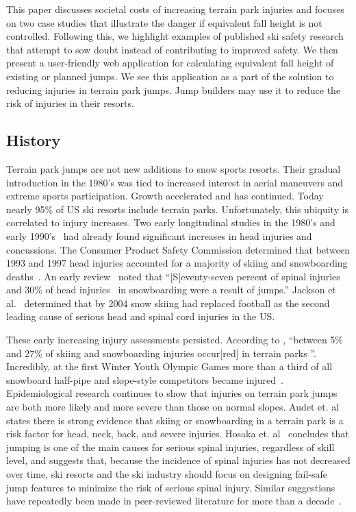 \documentclass{article}
\begin{document}
This paper discusses societal costs of increasing terrain park injuries and
focuses on two case studies that illustrate the danger if equivalent fall
height is not controlled. Following this, we highlight examples of published
ski safety research that attempt to sow doubt instead of contributing to
improved safety. We then present a user-friendly web application for
calculating equivalent fall height of existing or planned jumps. We see this
application as a part of the solution to reducing injuries in terrain park
jumps. Jump builders may use it to reduce the risk of injuries in their
resorts.

\subsection{History}
%
Terrain park jumps are not new additions to snow sports resorts. Their gradual
introduction in the 1980's was tied to increased interest in aerial maneuvers
and extreme sports participation. Growth accelerated and has continued. Today
nearly 95\% of US ski resorts include terrain parks. Unfortunately, this
ubiquity is correlated to injury increases. Two early longitudinal studies in
the 1980's and early 1990's~\cite{Deibert1998,Furrer1995} had already found
significant increases in head injuries and concussions. The Consumer Product
Safety Commission determined that between 1993 and 1997 head injuries accounted
for a majority of skiing and snowboarding deaths~\cite{CPSC1999}. An early
review~\cite{Koehle2002} noted that ``[S]eventy-seven percent of spinal
injuries~\cite{Tarazi1999} and 30\% of head injuries~\cite{Fukuda2001} in
snowboarding were a result of jumps.'' Jackson et al.~\cite{Jackson2004}
determined that by 2004 snow skiing had replaced football as the second leading
cause of serious head and spinal cord injuries in the US.

These early increasing injury assessments persisted. According to
\cite{Russell2014}, ``between 5\% and 27\% of skiing and snowboarding injuries
occur[red] in terrain parks
\cite{Bridges2003,Goulet2007,Moffat2009,Greve2009,Brooks2010,Ruedl2013}''.
Incredibly, at the first Winter Youth Olympic Games more than a third of all
snowboard half-pipe and slope-style competitors became
injured~\cite{Ruedl2012}. Epidemiological research continues to show
\cite{Carus2016,Audet2019a,Hosaka2020} that injuries on terrain park jumps are
both more likely and more severe than those on normal slopes. Audet et.
al~\cite{Audet2019a} states there is strong evidence that skiing or
snowboarding in a terrain park is a risk factor for head, neck, back, and
severe injuries. Hosaka et. al~\cite{Hosaka2020} concludes that jumping is one
of the main causes for serious spinal injuries, regardless of skill level, and
suggests that, because the incidence of spinal injuries has not decreased over
time, ski resorts and the ski industry should focus on designing fail-safe jump
features to minimize the risk of serious spinal injury. Similar suggestions
have repeatedly been made in peer-reviewed literature for more than a
decade~\cite{Hubbard2009,Swedberg2012,McNeil2012,McNeil2012a,Hubbard2015,
Levy2015,Petrone2017,Moore2018}.
\end{document}
